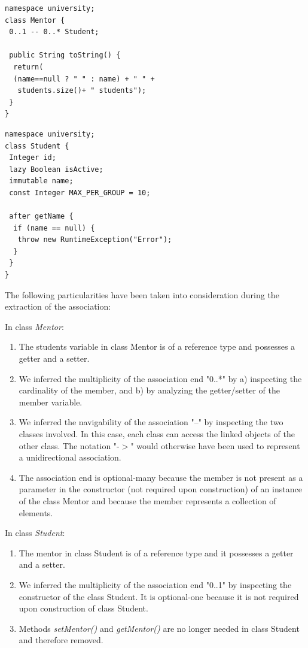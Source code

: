 \begin{lstlisting}[style=UmpleOut,caption=Mentor.ump,label=lst:mentorUmple2]
namespace university;
class Mentor {
 0..1 -- 0..* Student; 
 
 public String toString() {
  return(
  (name==null ? " " : name) + " " +
   students.size()+ " students");
 }
}
\end{lstlisting}

\begin{lstlisting}[style=UmpleOut,caption=Student.ump,label=lst:studentUmple2]
namespace university;
class Student {
 Integer id; 
 lazy Boolean isActive; 
 immutable name; 
 const Integer MAX_PER_GROUP = 10; 
 
 after getName {
  if (name == null) { 
   throw new RuntimeException("Error");
  }
 }
}
\end{lstlisting}

The following particularities have been taken into consideration during the extraction of the association:

In class \textit{Mentor}:
\begin{enumerate}
\item The students variable in class Mentor is of a reference type and possesses a getter and a setter.
\item We inferred the multiplicity of the association end "0..*" by a) inspecting the cardinality of the member, and b) by analyzing the getter/setter of the member variable.
\item We inferred the navigability of the association "--" by inspecting the two classes involved. In this case, each class can access the linked objects of the other class.  The notation "-$>$" would otherwise have been used to represent a unidirectional association. 

\item The association end is optional-many because the member is not present as a parameter in the constructor (not required upon construction) of an instance of the class Mentor and because the member represents a collection of elements. 
\end{enumerate}

In class \textit{Student}:
\begin{enumerate}

\item The mentor in class Student is of a reference type and it possesses a getter and a setter.
\item We inferred the multiplicity of the association end "0..1" by inspecting the constructor of the class Student. It is optional-one because it is not required upon construction of class Student. 
\item Methods \textit{setMentor()} and \textit{getMentor()} are no longer needed in class Student and therefore removed.
\end{enumerate}

